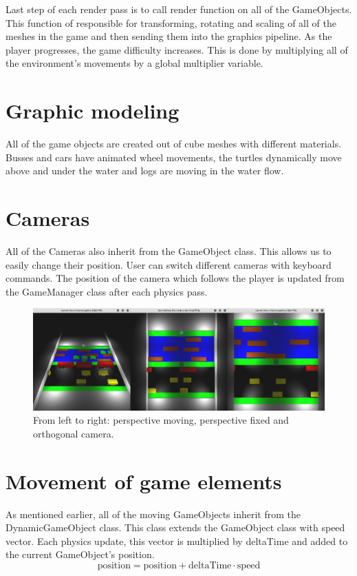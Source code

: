 \documentclass[a4paper,10pt]{article}
\begin{document}
Last step of each render pass is to call render function on all of the GameObjects. This function of responsible for transforming, rotating and scaling of all of the meshes in the game and then sending them into the graphics pipeline. As the player progresses, the game difficulty increases. This is done by multiplying all of the environment's movements by a global multiplier variable.

\section{Graphic modeling}
All of the game objects are created out of cube meshes with different materials. Busses and cars have animated wheel movements, the turtles dynamically move above and under the water and logs are moving in the water flow.

\section{Cameras}
All of the Cameras also inherit from the GameObject class. This allows us to easily change their position. User can switch different cameras with keyboard commands. The position of the camera which follows the player is updated from the GameManager class after each physics pass.

\begin{figure}[!htb]
	\centering
  	\includegraphics[width=\linewidth]{images/image6.png}
  	\caption{From left to right: perspective moving, perspective fixed and orthogonal camera.}
\end{figure}

\section{Movement of game elements}
As mentioned earlier, all of the moving GameObjects inherit from the DynamicGameObject class. This class extends the GameObject class with speed vector. Each physics update, this vector is multiplied by deltaTime and added to the current GameObject's position. $$\text{position} = \text{position} + \text{deltaTime} \cdot \text{speed}$$
\end{document}
